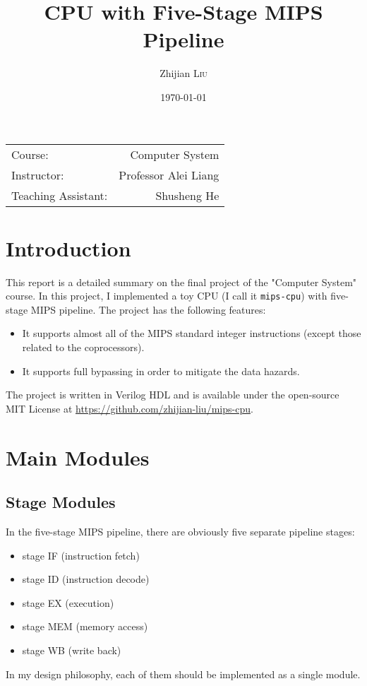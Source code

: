 \documentclass{article}
\title{CPU with Five-Stage MIPS Pipeline}
\author{Zhijian \textsc{Liu}}
\date{\today}
\begin{document}
\maketitle

\begin{center}
\begin{tabular}{l r}
Course: & Computer System\\
Instructor: & Professor Alei Liang\\
Teaching Assistant: & Shusheng He
\end{tabular}
\end{center}

\tableofcontents
\newpage

\section{Introduction}
This report is a detailed summary on the final project of the "Computer System" course. In this project, I implemented a toy CPU (I call it \texttt{mips-cpu}) with five-stage MIPS pipeline. The project has the following features:
\begin{itemize}
\item
It supports almost all of the MIPS standard integer instructions (except those related to the coprocessors).
\item
It supports full bypassing in order to mitigate the data hazards.
\end{itemize}
The project is written in Verilog HDL and is available under the open-source MIT License at \url{https://github.com/zhijian-liu/mips-cpu}.

\section{Main Modules}

\subsection{Stage Modules}
In the five-stage MIPS pipeline, there are obviously five separate pipeline stages:
\begin{itemize}
\item
stage IF (instruction fetch)
\item
stage ID (instruction decode)
\item
stage EX (execution)
\item
stage MEM (memory access)
\item
stage WB (write back)
\end{itemize}
In my design philosophy, each of them should be implemented as a single module.
\end{document}

